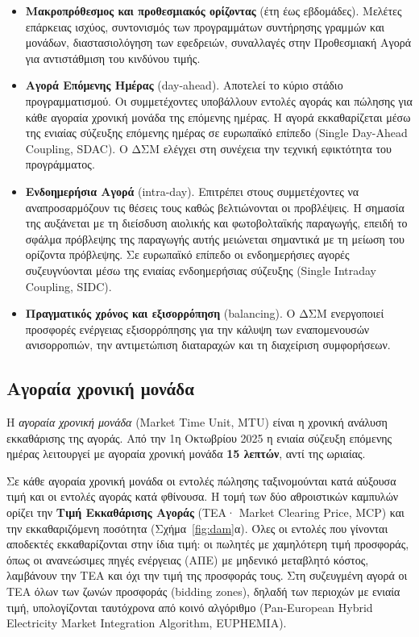 \begin{itemize}
\item \textbf{Μακροπρόθεσμος και προθεσμιακός ορίζοντας} (έτη έως εβδομάδες). Μελέτες
      επάρκειας ισχύος, συντονισμός των προγραμμάτων συντήρησης γραμμών και μονάδων,
      διαστασιολόγηση των εφεδρειών, συναλλαγές στην Προθεσμιακή Αγορά για αντιστάθμιση
      του κινδύνου τιμής.
\item \textbf{Αγορά Επόμενης Ημέρας} (day-ahead). Αποτελεί το κύριο στάδιο
      προγραμματισμού. Οι συμμετέχοντες υποβάλλουν εντολές αγοράς και πώλησης για κάθε
      αγοραία χρονική μονάδα της επόμενης ημέρας. Η αγορά εκκαθαρίζεται μέσω της ενιαίας
      σύζευξης επόμενης ημέρας σε ευρωπαϊκό επίπεδο (Single Day-Ahead Coupling, SDAC). Ο ΔΣΜ ελέγχει στη συνέχεια την
      τεχνική εφικτότητα του προγράμματος.
\item \textbf{Ενδοημερήσια Αγορά} (intra-day). Επιτρέπει στους συμμετέχοντες να
      αναπροσαρμόζουν τις θέσεις τους καθώς βελτιώνονται οι προβλέψεις. Η σημασία της
      αυξάνεται με τη διείσδυση αιολικής και φωτοβολταϊκής παραγωγής, επειδή το σφάλμα
      πρόβλεψης της παραγωγής αυτής μειώνεται σημαντικά με τη μείωση του ορίζοντα
      πρόβλεψης. Σε ευρωπαϊκό επίπεδο οι ενδοημερήσιες αγορές συζευγνύονται μέσω της ενιαίας
      ενδοημερήσιας σύζευξης (Single Intraday Coupling, SIDC).
\item \textbf{Πραγματικός χρόνος και εξισορρόπηση} (balancing). Ο ΔΣΜ ενεργοποιεί προσφορές
      ενέργειας εξισορρόπησης για την κάλυψη των εναπομενουσών ανισορροπιών, την
      αντιμετώπιση διαταραχών και τη διαχείριση συμφορήσεων.
\end{itemize}

\subsection{Αγοραία χρονική μονάδα}
\label{sec:mtu}

Η \emph{αγοραία χρονική μονάδα} (Market Time Unit, MTU) είναι η χρονική ανάλυση εκκαθάρισης
της αγοράς. Από την 1η Οκτωβρίου 2025 η ενιαία σύζευξη επόμενης ημέρας λειτουργεί με αγοραία χρονική
μονάδα \textbf{15 λεπτών}, αντί της ωριαίας. 

Σε κάθε αγοραία χρονική μονάδα οι εντολές πώλησης ταξινομούνται κατά αύξουσα τιμή και οι
εντολές αγοράς κατά φθίνουσα. Η τομή των δύο αθροιστικών καμπυλών ορίζει την \textbf{Τιμή
Εκκαθάρισης Αγοράς} (ΤΕΑ· Market Clearing Price, MCP) και την εκκαθαριζόμενη ποσότητα
(Σχήμα~\ref{fig:dam}α). Όλες οι εντολές που γίνονται αποδεκτές εκκαθαρίζονται στην ίδια τιμή: οι πωλητές με χαμηλότερη τιμή προσφοράς, όπως οι
ανανεώσιμες πηγές ενέργειας (ΑΠΕ) με μηδενικό μεταβλητό κόστος, λαμβάνουν την ΤΕΑ και όχι την τιμή της
προσφοράς τους. Στη συζευγμένη αγορά οι ΤΕΑ όλων των ζωνών προσφοράς (bidding zones), δηλαδή των περιοχών με ενιαία τιμή, υπολογίζονται ταυτόχρονα
από κοινό αλγόριθμο (Pan-European Hybrid Electricity Market Integration Algorithm,
EUPHEMIA).

